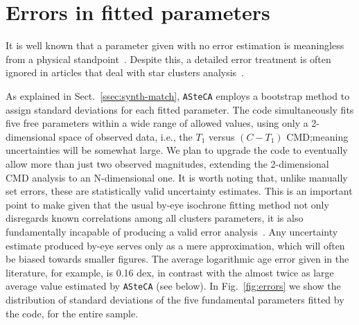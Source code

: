 \documentclass{aa}
\begin{document}

\section{Errors in fitted parameters}
\label{sec:errors-fit}

It is well known that a parameter given with no error estimation is
meaningless from a physical standpoint~\citep{Dolphin_2002,Andrae_2010}.
%
Despite this, a detailed error treatment is often ignored in
articles that deal with star clusters analysis~\citep{Paunzen_2006}.

As explained in Sect.~\ref{ssec:synth-match}, \texttt{ASteCA} employs a
bootstrap method to assign standard deviations for each fitted parameter.
%
The code simultaneously fits five free parameters within a wide range of allowed
values, using only a 2-dimensional space of observed data, i.e., the $T_1$
versus $ (C-T_1)$ CMD;\@ meaning uncertainties will be somewhat large.
We plan to upgrade the code to eventually allow more than just two observed
magnitudes, extending the 2-dimensional CMD analysis to an N-dimensional one.
%
It is worth noting that, unlike manually set errors, these are
statistically valid uncertainty estimates. This is an important point to make
given that the usual by-eye isochrone fitting method not only disregards known
correlations among all clusters parameters, it is also fundamentally incapable
of producing a valid error analysis~\citep{Naylor_2006}. Any uncertainty
estimate produced by-eye serves only as a mere approximation, which will often
be biased towards smaller figures. The average logarithmic age error given in
the literature, for example, is 0.16 dex, in contrast with the almost twice as
large average value estimated by \texttt{ASteCA} (see below).
%
In Fig.~\ref{fig:errors} we show the distribution of standard deviations
of the five fundamental parameters fitted by the code, for the entire sample.
\end{document}
